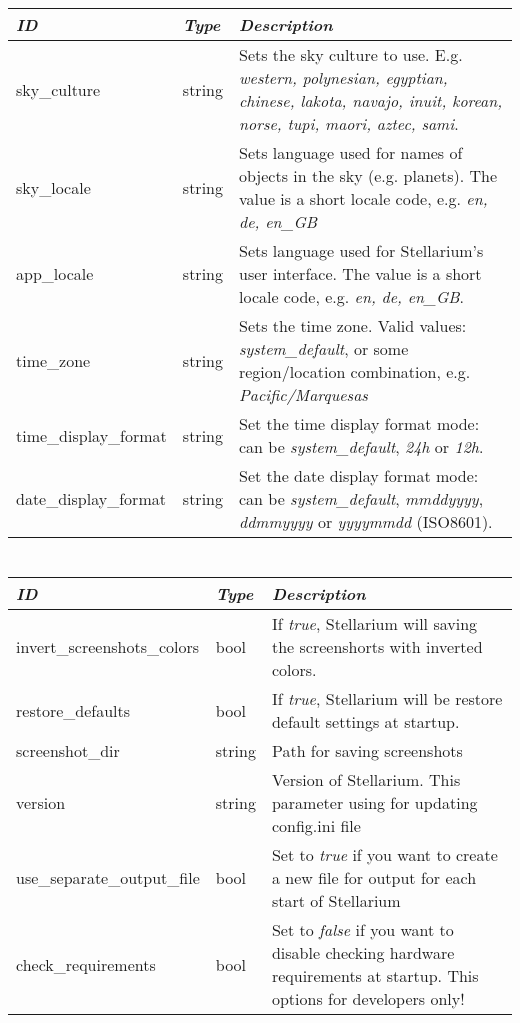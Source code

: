 \begin{longtabu} to \textwidth {l|l|X}
\toprule
\emph{ID} & \emph{Type} & \emph{Description}\tabularnewline
\midrule
sky\_culture & string & Sets the sky culture to use. E.g.
\emph{western, polynesian, egyptian, chinese, lakota, navajo, inuit,
korean, norse, tupi, maori, aztec, sami}.\tabularnewline
\midrule
sky\_locale & string & Sets language used for names of
objects in the sky (e.g. planets). The value is a short locale code,
e.g. \emph{en, de, en\_GB}\tabularnewline
\midrule
app\_locale & string & Sets language used for Stellarium's
user interface. The value is a short locale code, e.g. \emph{en, de,
en\_GB}.\tabularnewline
\midrule
time\_zone & string & Sets the time zone. Valid values:
\emph{system\_default}, or some region/location combination, e.g.
\emph{Pacific/Marquesas}\tabularnewline
\midrule
time\_display\_format & string & Set the time display format
mode: can be \emph{system\_default}, \emph{24h} or
\emph{12h}.\tabularnewline
\midrule
date\_display\_format & string & Set the date display format
mode: can be \emph{system\_default}, \emph{mmddyyyy}, \emph{ddmmyyyy} or
\emph{yyyymmdd} (ISO8601).\tabularnewline
\bottomrule
\end{longtabu}

\section{}\label{section-main}

\begin{longtabu} to \textwidth {l|l|X}
\toprule
\emph{ID} & \emph{Type} & \emph{Description}\tabularnewline
\midrule
invert\_screenshots\_colors & bool & If \emph{true},
Stellarium will saving the screenshorts with inverted
colors.\tabularnewline
\midrule
restore\_defaults & bool & If \emph{true}, Stellarium will be
restore default settings at startup.\tabularnewline
\midrule
screenshot\_dir & string & Path for saving
screenshots\tabularnewline
\midrule
version & string & Version of Stellarium. This parameter
using for updating config.ini file\tabularnewline
\midrule
use\_separate\_output\_file & bool & Set to \emph{true} if you
want to create a new file for output for each start of
Stellarium\tabularnewline
\midrule
check\_requirements & bool & Set to \emph{false} if you want
to disable checking hardware requirements at startup. This options for
developers only!\tabularnewline
\bottomrule
\end{longtabu}

\section{}\label{section-navigation}

